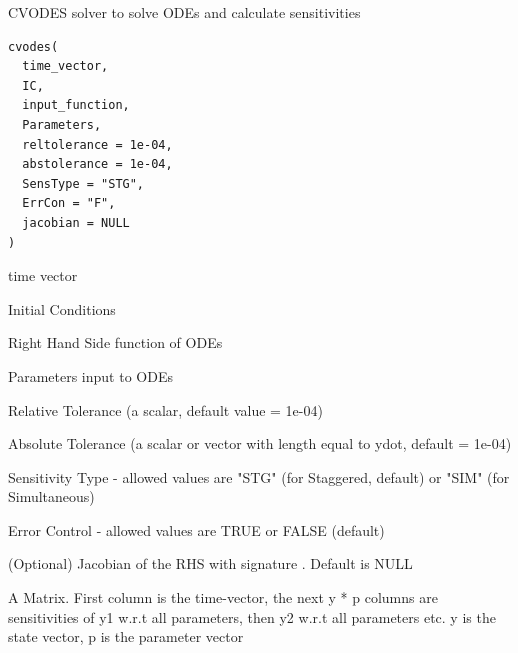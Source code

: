 \documentclass[letterpaper]{book}
\begin{document}
%
\begin{Description}
CVODES solver to solve ODEs and calculate sensitivities
\end{Description}
%
\begin{Usage}
\begin{verbatim}
cvodes(
  time_vector,
  IC,
  input_function,
  Parameters,
  reltolerance = 1e-04,
  abstolerance = 1e-04,
  SensType = "STG",
  ErrCon = "F",
  jacobian = NULL
)
\end{verbatim}
\end{Usage}
%
\begin{Arguments}
\begin{ldescription}
\item[\code{time\_vector}] time vector

\item[\code{IC}] Initial Conditions

\item[\code{input\_function}] Right Hand Side function of ODEs

\item[\code{Parameters}] Parameters input to ODEs

\item[\code{reltolerance}] Relative Tolerance (a scalar, default value  = 1e-04)

\item[\code{abstolerance}] Absolute Tolerance (a scalar or vector with length equal to ydot, default = 1e-04)

\item[\code{SensType}] Sensitivity Type - allowed values are "STG" (for Staggered, default) or "SIM" (for Simultaneous)

\item[\code{ErrCon}] Error Control - allowed values are TRUE or FALSE (default)

\item[\code{jacobian}] (Optional) Jacobian of the RHS with signature . Default is NULL
\end{ldescription}
\end{Arguments}
%
\begin{Value}
A Matrix. First column is the time-vector, the next y * p columns are sensitivities of y1 w.r.t all parameters, then y2 w.r.t all parameters etc. y is the state vector, p is the parameter vector
\end{Value}
%
\end{document}
